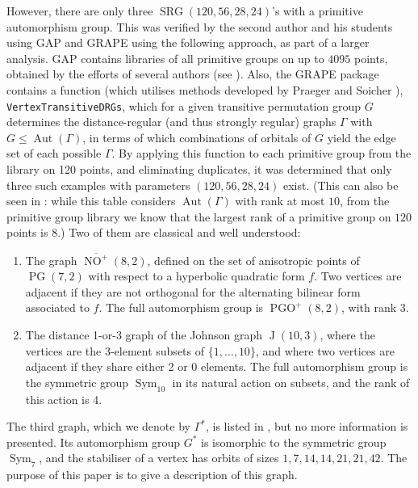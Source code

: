 \documentclass[a4paper]{article}
\theoremstyle{definition}
\renewcommand{\leq}{\leqslant}
\DeclareMathOperator{\PG}{PG}
\newcommand{\pg}{\PG}
\DeclareMathOperator{\PGO}{PGO}
\DeclareMathOperator{\NO}{NO}
\newcommand{\nono}{\overline{\NO^+}(8,2)}
\DeclareMathOperator{\Sym}{Sym}
\DeclareMathOperator{\SRG}{SRG}
\DeclareMathOperator{\Aut}{Aut}
\DeclareMathOperator{\Johnson}{J}
\begin{document}
However, there are only three $\SRG(120,56,28,24)$'s with a primitive automorphism group.  This was verified by the second author and his students using GAP \cite{GAP4} and GRAPE \cite{GRAPE} using the following approach, as part of a larger analysis.  GAP contains libraries of all primitive groups on up to $4095$ points, obtained by the efforts of several authors (see  \cite{Coutts,Dixon:Mortimer,RoneyDougal,RoneyDougal:Unger}).  Also, the GRAPE package contains a function (which utilises methods developed by Praeger and Soicher \cite{Praeger:Soicher}), \mbox{\texttt{VertexTransitiveDRGs}}, which for a given transitive permutation group $G$ determines the distance-regular (and thus strongly regular) graphs $\Gamma$ with $G\leq\Aut(\Gamma)$, in terms of which combinations of orbitals of $G$ yield the edge set of each possible $\Gamma$.  By applying this function to each primitive group from the library on 120 points, and eliminating duplicates, it was determined that only three such examples with parameters $(120,56,28,24)$ exist.  (This can also be seen in \cite[Table 11.9]{Brouwer:VanMaldeghem}: while this table considers $\Aut(\Gamma)$ with rank at most $10$, from the primitive group library we know that the largest rank of a primitive group on $120$ points is $8$.)
Two of them are classical and well understood:
\begin{enumerate}
 \item The graph $\nono$, defined on the set of anisotropic points of $\pg(7,2)$ with respect to a hyperbolic quadratic form $f$.
 Two vertices are adjacent if they are not orthogonal for the alternating bilinear form associated to $f$.
 The full automorphism group is $\PGO^+(8,2)$, with rank 3.
 \item The distance 1-or-3 graph of the Johnson graph $\Johnson(10,3)$, where the vertices are the 3-element subsets of $\{1,\dots,10\}$, and where two vertices are adjacent if they share either 2 or 0 elements.
 The full automorphism group is the symmetric group $\Sym_{10}$ in its natural action on subsets, and the rank of this action is 4.
\end{enumerate}

The third graph, which we denote by $\Gamma^*$, is listed in \cite[Table 11.9]{Brouwer:VanMaldeghem}, but no more information is presented.
Its automorphism group $G^*$ is isomorphic to the symmetric group $\Sym_7$, and the stabiliser of a vertex has orbits of sizes $1, 7, 14, 14, 21, 21, 42$.
The purpose of this paper is to give a description of this graph.
\end{document}
